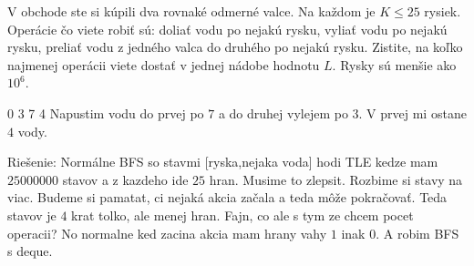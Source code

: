 
V obchode ste si kúpili dva rovnaké odmerné valce.
Na každom je $K\leq 25$ rysiek. Operácie čo viete
robiť sú: doliať vodu po nejakú  rysku, vyliať vodu
po nejakú rysku, preliať vodu z jedného valca do
druhého po nejakú rysku. Zistite, na koľko najmenej
operácii viete dostať v jednej nádobe hodnotu $L$.
Rysky sú menšie ako $10^6$.

0 3 7
4
\komentar
Napustim vodu do prvej po $7$ a do druhej vylejem po $3$.
V prvej mi ostane $4$ vody.
\koniec

Riešenie: Normálne BFS so stavmi [ryska,nejaka voda] hodi TLE
kedze mam $25000000$ stavov a z kazdeho ide $25$ hran. Musime
to zlepsit. Rozbime si stavy na viac. Budeme si pamatat, ci
nejaká akcia začala a teda môže pokračovať. Teda stavov je
$4$ krat tolko, ale menej hran. Fajn, co ale s tym ze chcem
pocet operacii? No normalne ked zacina akcia mam hrany vahy
$1$ inak $0$. A robim BFS s deque.
